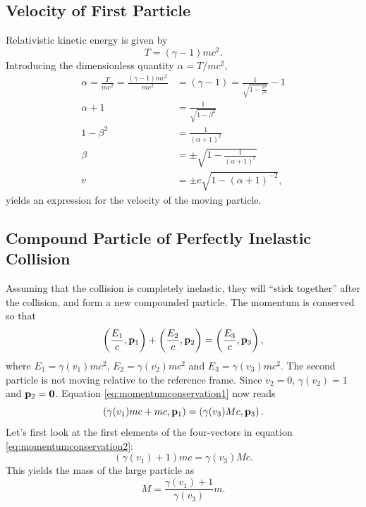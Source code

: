 \documentclass[11pt]{amsart}
\begin{document}
\subsection{Velocity of First Particle}
Relativistic kinetic energy is given by
\begin{equation}
\label{eq:relkinenergy}
T = (\gamma-1)mc^2.
\end{equation}
Introducing the dimensionless quantity $\alpha = T/mc^2$,
\begin{align*}
\alpha = \frac{T}{mc^2} = \frac{(\gamma - 1)mc^2}{mc^2} &= (\gamma-1) = \frac{1}{\sqrt{1-\frac{v^2}{c^2}}} - 1 \\
\alpha + 1 &= \frac{1}{\sqrt{1-\beta^2}} \\
1 - \beta^2 &= \frac{1}{(\alpha + 1)^2} \\
\beta &= \pm \sqrt{1 - \frac{1}{(\alpha + 1)^2}} \\
v &= \pm c \sqrt{1-(\alpha + 1)^{-2}},
\end{align*}
yields an expression for the velocity of the moving particle.

\subsection{Compound Particle of Perfectly Inelastic Collision}
Assuming that the collision is completely inelastic, they will ``stick together'' after the collision, and form a new compounded particle. The momentum is conserved so that
\begin{equation}
\label{eq:momentumconservation1}
\left(\frac{E_1}{c}, \vb{p}_1 \right) + \left(\frac{E_2}{c}, \vb{p}_2 \right) = \left(\frac{E_3}{c}, \vb{p}_3 \right) ,
\end{equation}
where $E_1 = \gamma(v_1)mc^2$, $E_2 = \gamma(v_2)mc^2$ and $E_3 = \gamma(v_3)mc^2$. The second particle is not moving relative to the reference frame. Since $v_2=0$, $\gamma(v_2)=1$ and $\vb{p}_2 = \vb{0}$. Equation \ref{eq:momentumconservation1} now reads
\begin{equation}
\label{eq:momentumconservation2}
\left(\gamma(v_1)mc + mc, \vb{p}_1\right) = \left(\gamma(v_3)Mc, \vb{p}_3\right).
\end{equation}
Let's first look at the first elements of the four-vectors in equation \ref{eq:momentumconservation2}:
\begin{equation}
(\gamma(v_1)+1)mc = \gamma(v_3)Mc.
\end{equation}
This yields the mass of the large particle as
\begin{equation}
\label{eq:largemass}
M = \frac{\gamma(v_1) + 1}{\gamma(v_3)}m.
\end{equation}
\end{document}
